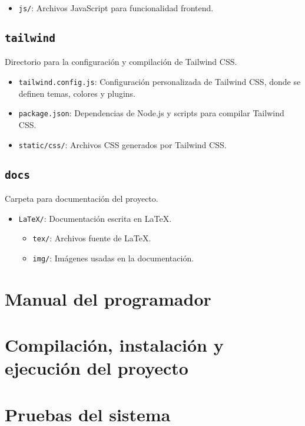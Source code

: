 \begin{itemize}
    \item \texttt{js/}: Archivos JavaScript para funcionalidad frontend.
\end{itemize}

\subsection{\texttt{tailwind}}
Directorio para la configuración y compilación de Tailwind CSS.

\begin{itemize}
    \item \texttt{tailwind.config.js}: Configuración personalizada de Tailwind CSS, donde se definen temas, colores y plugins.
    \item \texttt{package.json}: Dependencias de Node.js y scripts para compilar Tailwind CSS.
    \item \texttt{static/css/}: Archivos CSS generados por Tailwind CSS.
\end{itemize}

\subsection{\texttt{docs}}
Carpeta para documentación del proyecto.

\begin{itemize}
    \item \texttt{LaTeX/}: Documentación escrita en LaTeX.
    \begin{itemize}
        \item \texttt{tex/}: Archivos fuente de LaTeX.
        \item \texttt{img/}: Imágenes usadas en la documentación.
    \end{itemize}
\end{itemize}


\section{Manual del programador}

\section{Compilación, instalación y ejecución del proyecto}

\section{Pruebas del sistema}
